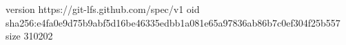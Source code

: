 version https://git-lfs.github.com/spec/v1
oid sha256:e4fa0e9d75b9abf5d16be46335edbb1a081e65a97836ab86b7c0ef304f25b557
size 310202
